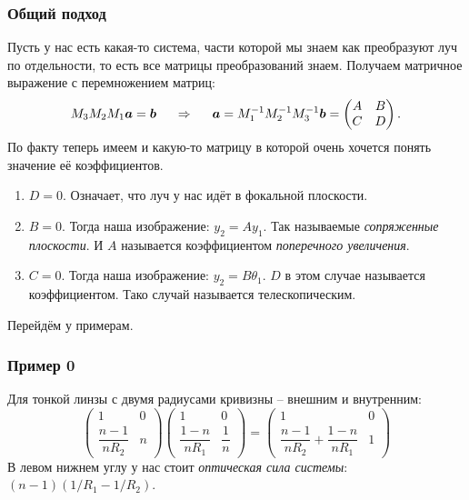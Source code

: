 \subsubsection*{Общий подход}
Пусть у нас есть какая-то система, части которой мы знаем как преобразуют луч по отдельности, то есть все матрицы преобразований знаем. Получаем матричное выражение с перемножением матриц:
\begin{equation*}
	M_3 M_2 M_1 \mbox{\boldmath $a$} = \mbox{\boldmath $b$}
	\hspace{0.5 cm}
	\Rightarrow
	\hspace{0.5 cm}
	\mbox{\boldmath $a$} = M_1^{-1} M_2^{-1}  M_3^{-1} \mbox{\boldmath $b$} =
	\begin{pmatrix}
		A & B \\ C & D
	\end{pmatrix}.
\end{equation*}
По факту теперь имеем и какую-то матрицу в которой очень хочется понять значение её коэффициентов.
\begin{enumerate}
	\item  $D = 0$. Означает, что луч у нас идёт в фокальной плоскости.
	\item $B = 0$. Тогда наша изображение: $y_2 = A y_1$. Так называемые \textit{сопряженные плоскости}. И $A$ называется коэффициентом \textit{поперечного увеличения}.
	\item $C = 0$. Тогда наша изображение: $y_2 = B \theta_1$. $D$ в этом случае называется коэффициентом. Тако	случай называется телескопическим.
\end{enumerate}

Перейдём у примерам.
\subsubsection*{Пример 0}
Для тонкой линзы с двумя радиусами кривизны -- внешним и внутренним:
	\begin{equation*}
		\begin{pmatrix}
			1 & 0 \\ \dfrac{n-1}{n R_2} & n
		\end{pmatrix}
		\begin{pmatrix}
			1 & 0 \\ \dfrac{1-n}{n R_1} & \dfrac{1}{n}
		\end{pmatrix}
		=
		\begin{pmatrix}
			1 & 0 \\ \dfrac{n-1}{n R_2} + \dfrac{1-n}{n R_1} & 1
		\end{pmatrix}
	\end{equation*}
	В левом нижнем углу у нас стоит \textit{оптическая сила системы}: $(n-1) \left(1/R_1 - 1/R_2\right)$.

